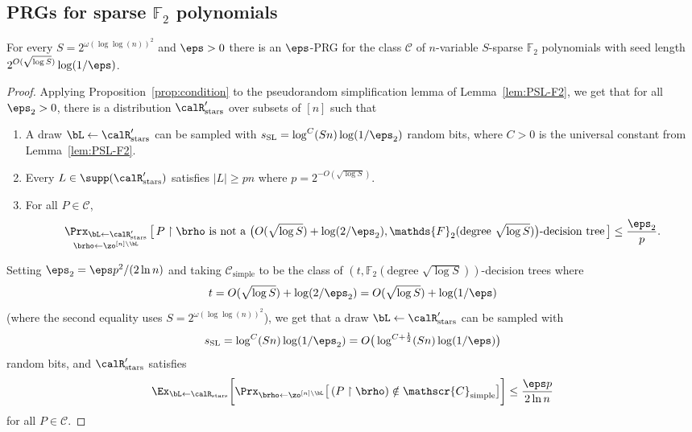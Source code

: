 \documentclass{toc}
\theoremstyle{plain}
\newcommand{\uhr}{\upharpoonright}
\newcommand{\simple}{\mathrm{simple}}
\newcommand{\stars}{\mathrm{stars}}
\newcommand{\SL}{\mathrm{SL}}
\renewcommand{\F}{\mathds{F}}
\begin{document}
\subsection{PRGs for sparse $\F_2$ polynomials} 



\begin{theorem}
For every $S = 2^{\omega(\log \log(n))^2}$ and $\eps > 0$ there is an $\eps$-PRG for the class $\mathscr{C}$ of $n$-variable $S$-sparse $\F_2$ polynomials with seed length $2^{O(\sqrt{\log S})}\log(1/\eps)$. 
\end{theorem} 


\begin{proof} 
Applying Proposition~\ref{prop:condition} to the pseudorandom simplification lemma of Lemma~\ref{lem:PSL-F2}, we get that for all $\eps_2 > 0$, there is a distribution $\calR'_\stars$ over subsets of $[n]$ such that 
\begin{enumerate}
\item A draw $\bL \leftarrow \calR'_\stars$ can be sampled with $s_\SL = \log^C(Sn)\log(1/\eps_2)$ random bits, where $C > 0$ is the universal constant from Lemma~\ref{lem:PSL-F2}.
\item Every $L\in \supp(\calR'_\stars)$ satisfies $|L| \ge pn$ where $p = 2^{-O(\sqrt{\log S})}$. 
\item For all $P \in \mathscr{C}$, 
\[ \mathop{\Prx_{\bL\leftarrow\calR'_\stars}}_{\brho\leftarrow\zo^{[n]\setminus \bL}}\big[\,\text{$P \uhr \brho$ is not a $\big(O(\sqrt{\log S}) +  \log(2/\eps_2), \F_2(\text{degree $\sqrt{\log S}$})\big)$-decision tree}\,\big] \le \frac{\eps_2}{p}. \] 
\end{enumerate}
Setting $\eps_2 = \eps p^2/(2\ln n)$ and taking $\mathscr{C}_\simple$ to be the class of $(t,\F_2(\text{degree $\sqrt{\log S}$}))$-decision trees where 
\[ t = O(\sqrt{\log S}) + \log(2/\eps_2) = O(\sqrt{\log S})  +  \log(1/\eps) \]
(where the second equality uses $S = 2^{\omega(\log \log(n))^2}$),
we get that a draw $\bL \leftarrow\calR'_\stars$ can be sampled with  
\[ s_\SL = \log^C(Sn) \log(1/\eps_2) =  O\big(\log^{C+ \frac1{2}}(Sn)\log(1/\eps)\big)  \]
random bits, and $\calR'_\stars$ satisfies
 \[ \Ex_{\bL\leftarrow\calR_{\stars}}\bigg[ \Prx_{\brho\leftarrow\zo^{[n]\setminus \bL}}\big[\, (P \uhr \brho) \notin \mathscr{C}_\simple\big] \bigg]  \le \frac{\eps p}{2\ln n}\] 
 for all $P \in \mathscr{C}$. 
 

\end{proof}
\end{document}
